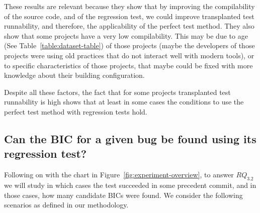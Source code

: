 These results are relevant because they show that by improving the compilability of the source code, and of the regression test, we could improve transplanted test runnability, and therefore, the applicability of the perfect test method. They also show that some projects have a very low compilability. 
This may be due to age (See Table~\ref{table:dataset-table})
of those projects (maybe the developers of those projects were using old practices that do not interact well with modern tools), or to specific characteristics of those projects, that maybe could be fixed with more knowledge about their building configuration.

Despite all these factors, the fact that for some projects transplanted test runnability is high shows that at least in some cases the conditions to use the perfect test method with regression tests hold.

\newpage

\vspace{0.4cm}


\subsection{Can the BIC for a given bug be found using its regression test?}
\label{sec:rq2}

Following on with the chart in Figure~\ref{fig:experiment-overview}, to answer $RQ_{3.2}$ we will study in which cases the test succeeded in some precedent commit, and in those cases, how many candidate BICs were found. We consider the following scenarios as defined in our methodology. 

